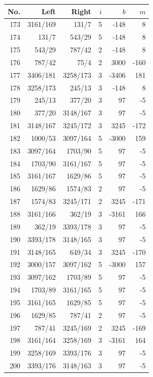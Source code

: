 \documentclass[11pt,a4paper]{article}
\begin{document}
\noindent\begin{minipage}[t]{.49\linewidth}\centering\footnotesize\setlength{\tabcolsep}{2pt}\renewcommand{\arraystretch}{1.09}
\begin{tabular*}{\linewidth}{@{}r@{\extracolsep{\fill}}rrrrr@{}}\toprule
No. & Left & Right & $i$ & $b$ & $m$\\\midrule
173 & 3161/169 & 131/7 & 5 & -148 & 8\\
174 & 131/7 & 543/29 & 5 & -148 & 8\\
175 & 543/29 & 787/42 & 2 & -148 & 8\\
176 & 787/42 & 75/4 & 2 & 3000 & -160\\
177 & 3406/181 & 3258/173 & 3 & -3406 & 181\\
178 & 3258/173 & 245/13 & 3 & -148 & 8\\
179 & 245/13 & 377/20 & 3 & 97 & -5\\
180 & 377/20 & 3148/167 & 3 & 97 & -5\\
181 & 3148/167 & 3245/172 & 3 & 3245 & -172\\
182 & 1000/53 & 3097/164 & 5 & -3000 & 159\\
183 & 3097/164 & 1703/90 & 5 & 97 & -5\\
184 & 1703/90 & 3161/167 & 5 & 97 & -5\\
185 & 3161/167 & 1629/86 & 5 & 97 & -5\\
186 & 1629/86 & 1574/83 & 2 & 97 & -5\\
187 & 1574/83 & 3245/171 & 2 & 3245 & -171\\
188 & 3161/166 & 362/19 & 3 & -3161 & 166\\
189 & 362/19 & 3393/178 & 3 & 97 & -5\\
190 & 3393/178 & 3148/165 & 3 & 97 & -5\\
191 & 3148/165 & 649/34 & 3 & 3245 & -170\\
192 & 3000/157 & 3097/162 & 5 & -3000 & 157\\
193 & 3097/162 & 1703/89 & 5 & 97 & -5\\
194 & 1703/89 & 3161/165 & 5 & 97 & -5\\
195 & 3161/165 & 1629/85 & 5 & 97 & -5\\
196 & 1629/85 & 787/41 & 2 & 97 & -5\\
197 & 787/41 & 3245/169 & 2 & 3245 & -169\\
198 & 3161/164 & 3258/169 & 3 & -3161 & 164\\
199 & 3258/169 & 3393/176 & 3 & 97 & -5\\
200 & 3393/176 & 3148/163 & 3 & 97 & -5\\

\end{tabular*}
\end{minipage}
\end{document}
